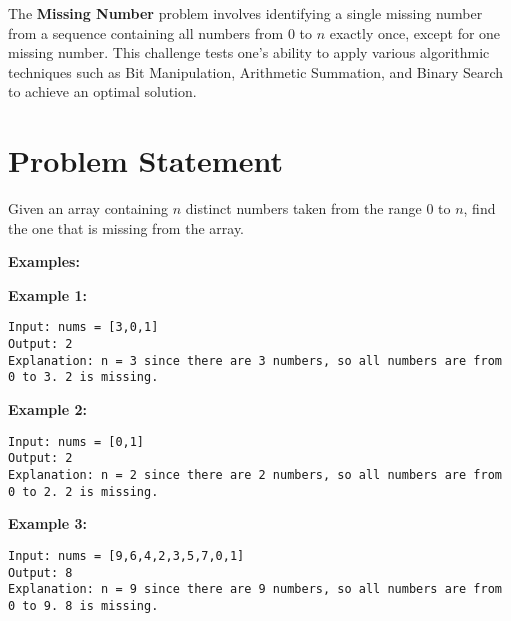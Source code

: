 
\label{problem:missing_number}

The \textbf{Missing Number} problem involves identifying a single missing number from a sequence containing all numbers from \(0\) to \(n\) exactly once, except for one missing number. This challenge tests one's ability to apply various algorithmic techniques such as Bit Manipulation, Arithmetic Summation, and Binary Search to achieve an optimal solution.

\section*{Problem Statement}

Given an array containing \(n\) distinct numbers taken from the range \(0\) to \(n\), find the one that is missing from the array.

\textbf{Examples:}

\textbf{Example 1:}

\begin{verbatim}
Input: nums = [3,0,1]
Output: 2
Explanation: n = 3 since there are 3 numbers, so all numbers are from 0 to 3. 2 is missing.
\end{verbatim}

\textbf{Example 2:}

\begin{verbatim}
Input: nums = [0,1]
Output: 2
Explanation: n = 2 since there are 2 numbers, so all numbers are from 0 to 2. 2 is missing.
\end{verbatim}

\textbf{Example 3:}

\begin{verbatim}
Input: nums = [9,6,4,2,3,5,7,0,1]
Output: 8
Explanation: n = 9 since there are 9 numbers, so all numbers are from 0 to 9. 8 is missing.
\end{verbatim}

